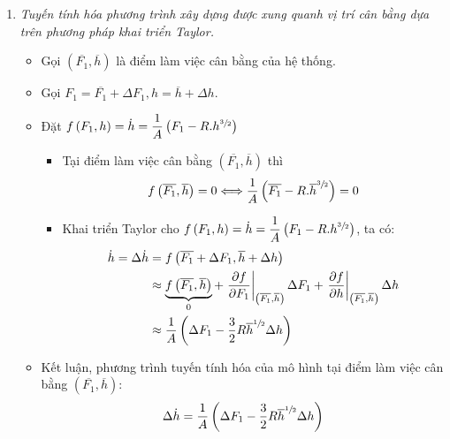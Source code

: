 \begin{enumerate}[\it a.]
        \item \textit{Tuyến tính hóa phương trình xây dựng được xung quanh vị trí cân bằng dựa trên phương pháp khai triển Taylor.}
            \begin{itemize}
                \item Gọi $\left({\overline{F_1}, \overline{h}}\right)$ là điểm làm việc cân bằng của hệ thống.

                \item Gọi $F_1 = \overline{F_1} + \Delta F_1, h = \overline{h} + \Delta h$.

                \item Đặt $f\left({F_1, h}\right) = \dot{h} = \dfrac{1}{A} \left({F_1 - R.h^{\sfrac{3}{2}}}\right)$
                    \begin{itemize}
                        \item Tại điểm làm việc cân bằng $\left({\overline{F_1}, \overline{h}}\right)$ thì
                            \begin{align}
                                f\left({\overline{F_1}, \overline{h}}\right) = 0 \Longleftrightarrow \dfrac{1}{A} \left({\overline{F_1} - R.\overline{h}^{\sfrac{3}{2}}}\right) = 0
                            \end{align}

                        \item Khai triển Taylor cho $f \left({F_1, h}\right) = \dot{h} = \dfrac{1}{A} \left({F_1 - R.h^{\sfrac{3}{2}}}\right)$, ta có:
                            \begin{align}
                                \dot{h} = \Delta \dot{h} & = f\left({\overline{F_1} + \Delta F_1, \overline{h} + \Delta h}\right) \\
                                & \approx \underbrace{f \left({\overline{F_1}, \overline{h}}\right)}_{0} + \left.\dfrac{\partial f}{\partial F_1}\right|_{\left({\overline{F_1}, \overline{h}}\right)} \Delta F_1 + \left.\dfrac{\partial f}{\partial h}\right|_{\left({\overline{F_1}, \overline{h}}\right)} \Delta h\\
                                & \approx \dfrac{1}{A} \left({\Delta F_1 - \dfrac{3}{2} R \overline{h}^{\sfrac{1}{2}} \Delta h}\right)
                            \end{align}


                    \end{itemize}

                \item Kết luận, phương trình tuyến tính hóa của mô hình tại điểm làm việc cân bằng $\left({\overline{F_1}, \overline{h}}\right)$:
                    \begin{align}
                        \Delta \dot{h} = \dfrac{1}{A} \left({\Delta F_1 - \dfrac{3}{2} R \overline{h}^{\sfrac{1}{2}} \Delta h}\right)
                    \end{align}
            \end{itemize}


\end{enumerate}
